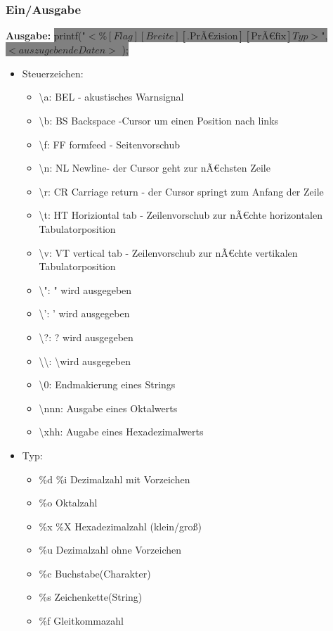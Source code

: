 \documentclass[10pt,a5paper]{article}
\newcommand{\cbg}[1]{\colorbox{grey}{#1}}
\begin{document}
\subsubsection{Ein/Ausgabe}
\textbf{Ausgabe:} \cbg{printf(\ensuremath{\text{"}< \%[Flag][Breite][\text{.PrÃ€zision}][\text{PrÃ€fix}]Typ>\text{"}},\ensuremath{<auszugebende Daten>} );}
\begin{itemize}
\item Steuerzeichen:\begin{itemize}
 \item \textbackslash a: BEL - akustisches Warnsignal
 \item \textbackslash b: BS Backspace -Cursor um einen Position nach links
 \item \textbackslash f: FF formfeed - Seitenvorschub
 \item \textbackslash n: NL Newline- der Cursor geht zur nÃ€chsten Zeile
 \item \textbackslash r: CR Carriage return - der Cursor springt zum Anfang der Zeile
 \item \textbackslash t: HT Horiziontal tab - Zeilenvorschub zur nÃ€chte horizontalen Tabulatorposition
 \item \textbackslash v: VT vertical tab - Zeilenvorschub zur nÃ€chte vertikalen Tabulatorposition
 \item \textbackslash ": " wird ausgegeben
 \item \textbackslash ': ' wird ausgegeben
 \item \textbackslash ?: ? wird ausgegeben
 \item \textbackslash \textbackslash: \textbackslash wird ausgegeben
 \item \textbackslash 0: Endmakierung eines Strings
 \item \textbackslash nnn: Ausgabe eines Oktalwerts
 \item \textbackslash xhh: Augabe eines Hexadezimalwerts
\end{itemize}
\item Typ: \begin{itemize}
\item \%d \%i Dezimalzahl mit Vorzeichen
\item \%o Oktalzahl
\item \%x \%X Hexadezimalzahl (klein/groß)
\item \%u Dezimalzahl ohne Vorzeichen
\item \%c Buchstabe(Charakter)
\item \%s Zeichenkette(String)
\item \%f Gleitkommazahl

\end{itemize}
\end{itemize}
\end{document}
